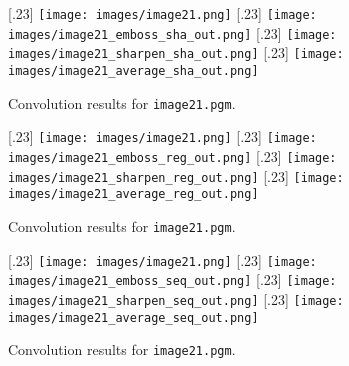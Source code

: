 \begin{figure}[h]
  \centering
  [.23\linewidth]{%
    \texttt{[image: images/image21.png]}}
  \hfill
  [.23\linewidth]{%
    \texttt{[image: images/image21\_emboss\_sha\_out.png]}}
  \hfill
  [.23\linewidth]{%
    \texttt{[image: images/image21\_sharpen\_sha\_out.png]}}
  \hfill
  [.23\linewidth]{%
    \texttt{[image: images/image21\_average\_sha\_out.png]}}
  \caption{Convolution results for \texttt{image21.pgm}.}
  \label{fig:image21_results}
\end{figure}
\begin{figure}[h]
  \centering
  [.23\linewidth]{%
    \texttt{[image: images/image21.png]}}
  \hfill
  [.23\linewidth]{%
    \texttt{[image: images/image21\_emboss\_reg\_out.png]}}
  \hfill
  [.23\linewidth]{%
    \texttt{[image: images/image21\_sharpen\_reg\_out.png]}}
  \hfill
  [.23\linewidth]{%
    \texttt{[image: images/image21\_average\_reg\_out.png]}}
  \caption{Convolution results for \texttt{image21.pgm}.}
  \label{fig:image21_results}
\end{figure}
\begin{figure}[h]
  \centering
  [.23\linewidth]{%
    \texttt{[image: images/image21.png]}}
  \hfill
  [.23\linewidth]{%
    \texttt{[image: images/image21\_emboss\_seq\_out.png]}}
  \hfill
  [.23\linewidth]{%
    \texttt{[image: images/image21\_sharpen\_seq\_out.png]}}
  \hfill
  [.23\linewidth]{%
    \texttt{[image: images/image21\_average\_seq\_out.png]}}
  \caption{Convolution results for \texttt{image21.pgm}.}
  \label{fig:image21_results}
\end{figure}



